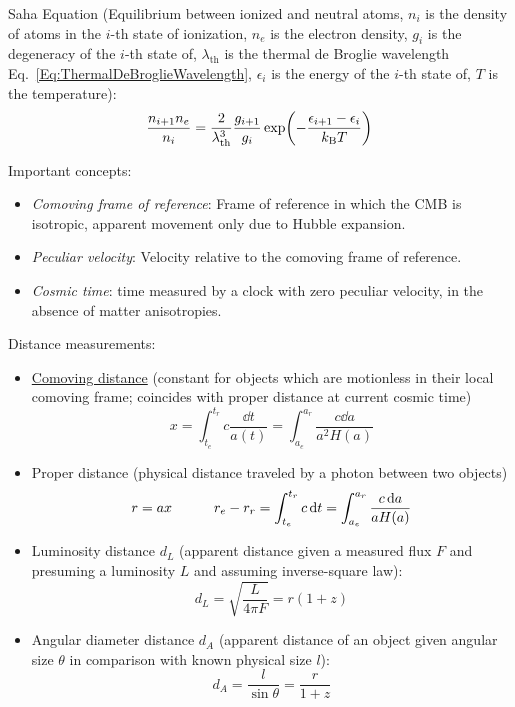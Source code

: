 		\noindent
		Saha Equation (Equilibrium between ionized and neutral atoms, $n_i$ is the density of atoms in the $i$-th state of ionization, $n_e$ is the electron density, $g_i$ is the degeneracy of the $i$-th state of, $\lambda_\text{th}$ is the thermal de Broglie wavelength Eq.~\ref{Eq:ThermalDeBroglieWavelength}, $\epsilon_i$ is the energy of the $i$-th state of, $T$ is the temperature):
		\begin{equation}
			\frac{n_{i+1} n_e}{n_i} = \frac{2}{\lambda_\text{th}^3} \frac{g_{i+1}}{g_i} \exp(- \frac{\epsilon_{i+1}-\epsilon_{i}}{k_{\text{B}} T})
		\end{equation}


		\noindent
		Important concepts:
		\begin{itemize}
			\item \emph{Comoving frame of reference}: Frame of reference in which the CMB is isotropic, apparent movement only due to Hubble expansion.
			\item \emph{Peculiar velocity}: Velocity relative to the comoving frame of reference.
			\item \emph{Cosmic time}: time measured by a clock with zero peculiar velocity, in the absence of matter anisotropies.
		\end{itemize}

		\noindent
		Distance measurements:
		\begin{itemize}
			\item \href{https://en.wikipedia.org/wiki/Comoving_and_proper_distances}{Comoving distance} (constant for objects which are motionless in their local comoving frame; coincides with proper distance at current cosmic time)
				\begin{equation}
					x = \int_{t_e}^{t_r} c\frac{\dd t}{a(t)}
					= \int_{a_e}^{a_r} \frac{c \dd a}{a^2 H(a)}
				\end{equation}
			\item Proper distance (physical distance traveled by a photon between two objects)
				\begin{equation}
					r = a x
					\hspace{30pt}
					r_e - r_r = \int_{t_e}^{t_r} c \,\dd t
					= \int_{a_e}^{a_r} \frac{c\, \dd a}{a H(a)}
				\end{equation}
			\item Luminosity distance $d_L$ (apparent distance given a measured flux $F$ and presuming a luminosity $L$ and assuming inverse-square law):
				\begin{equation}
					d_L = \sqrt{\frac{L}{4 \pi F}} = r (1+z)
				\end{equation}
			\item Angular diameter distance $d_A$ (apparent distance of an object given angular size $\theta$ in comparison with known physical size $l$):
				\begin{equation}
					d_A = \frac{l}{\sin \theta} = \frac{r}{1+z}
				\end{equation}
		\end{itemize}



